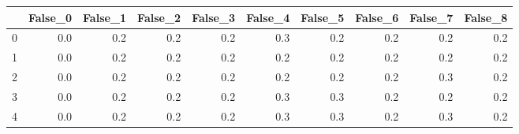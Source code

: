 \begin{tabular}{lrrrrrrrrr}
\toprule
{} &  False\_0 &  False\_1 &  False\_2 &  False\_3 &  False\_4 &  False\_5 &  False\_6 &  False\_7 &  False\_8 \\ \hline
\midrule
0 &      0.0 &      0.2 &      0.2 &      0.2 &      0.3 &      0.2 &      0.2 &      0.2 &      0.2 \\ \hline
1 &      0.0 &      0.2 &      0.2 &      0.2 &      0.2 &      0.2 &      0.2 &      0.2 &      0.2 \\ \hline
2 &      0.0 &      0.2 &      0.2 &      0.2 &      0.2 &      0.2 &      0.2 &      0.3 &      0.2 \\ \hline
3 &      0.0 &      0.2 &      0.2 &      0.2 &      0.3 &      0.3 &      0.2 &      0.2 &      0.2 \\ \hline
4 &      0.0 &      0.2 &      0.2 &      0.2 &      0.3 &      0.3 &      0.2 &      0.3 &      0.2 \\ \hline
\bottomrule
\end{tabular}

